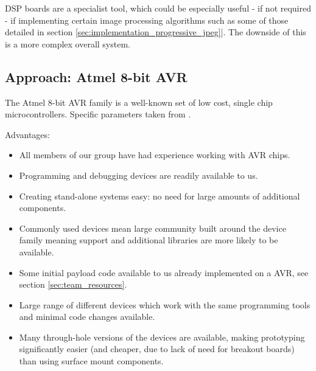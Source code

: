 DSP boards are a specialist tool, which could be especially useful - if not required - if implementing certain image processing algorithms such as some of those detailed in section  \ref{sec:implementation_progressive_jpeg}|. The downside of this is a more complex overall system.

\subsection{Approach: Atmel 8-bit AVR}
\label{sec:desappr:avr}
The Atmel 8-bit AVR family is a well-known set of low cost, single chip microcontrollers. Specific parameters taken from \cite{megaAVR_parameters}.

Advantages:
\begin{itemize}
\item All members of our group have had experience working with AVR chips.

\item Programming and debugging devices are readily available to us.

\item Creating stand-alone systems easy: no need for large amounts of additional components.

\item Commonly used devices mean large community built around the device family meaning support and additional libraries are more likely to be available.

\item Some initial payload code available to us already implemented on a AVR, see section \ref{sec:team_resources}.

\item Large range of different devices which work with the same programming tools and minimal code changes available.

\item Many through-hole versions of the devices are available, making prototyping significantly easier (and cheaper, due to lack of need for breakout boards) than using surface mount components.
\end{itemize}

